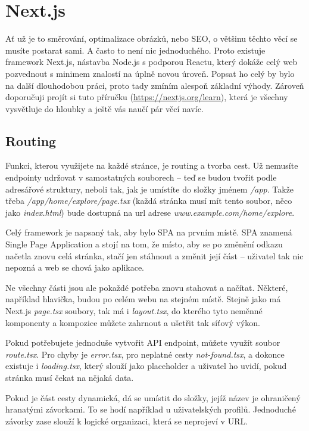 \section{Next.js}

Ať už je to směrování, optimalizace obrázků, nebo SEO, o většinu těchto věcí se musíte postarat sami. A často to není nic jednoduchého. Proto existuje framework Next.js\cite{NextJSDocs}, nástavba Node.js s podporou Reactu, který dokáže celý web pozvednout s minimem znalostí na úplně novou úroveň. Popsat ho celý by bylo na další dlouhodobou práci, proto tady zmíním alespoň základní výhody. Zároveň doporučuji projít si tuto příručku (\href{https://nextjs.org/learn}{https://nextjs.org/learn})\cite{NextJSLearn}, která je všechny vysvětluje do hloubky a ještě vás naučí pár věcí navíc.

\subsection*{Routing}

Funkci, kterou využijete na každé stránce, je routing a tvorba cest. Už nemusíte endpointy udržovat v samostatných souborech – teď se budou tvořit podle adresářové struktury, neboli tak, jak je umístíte do složky jménem \textit{/app}. Takže třeba \textit{/app/home/explore/page.tsx} (každá stránka musí mít tento soubor, něco jako \textit{index.html}) bude dostupná na url adrese \textit{www.example.com/home/explore}.

Celý framework je napsaný tak, aby bylo SPA na prvním místě. SPA znamená Single Page Application a stojí na tom, že místo, aby se po změnění odkazu načetla znovu celá stránka, stačí jen stáhnout a změnit její část – uživatel tak nic nepozná a web se chová jako aplikace.

Ne všechny části jsou ale pokaždé potřeba znovu stahovat a načítat. Některé, například hlavička, budou po celém webu na stejném místě. Stejně jako má Next.js \textit{page.tsx} soubory, tak má i \textit{layout.tsx}, do kterého tyto neměnné komponenty a kompozice můžete zahrnout a ušetřit tak síťový výkon.

Pokud potřebujete jednoduše vytvořit API endpoint, můžete využít soubor \textit{route.tsx}. Pro chyby je \textit{error.tsx}, pro neplatné cesty \textit{not-found.tsx}, a dokonce existuje i \textit{loading.tsx}, který slouží jako placeholder a uživatel ho uvidí, pokud stránka musí čekat na nějaká data.

Pokud je část cesty dynamická, dá se umístit do složky, jejíž název je ohraničený hranatými závorkami. To se hodí například u uživatelských profilů. Jednoduché závorky zase slouží k logické organizaci, která se neprojeví v URL.

